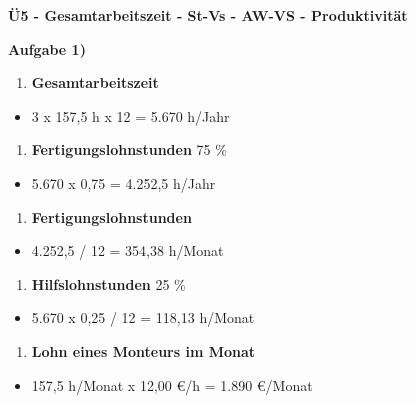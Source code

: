 \textbf{Ü5 - Gesamtarbeitszeit - St-Vs - AW-VS - Produktivität}

\textbf{Aufgabe 1)}

\begin{enumerate}
\def\labelenumi{\alph{enumi})}
\item
  \textbf{Gesamtarbeitszeit}
\end{enumerate}

\begin{itemize}
\item
  3 x 157,5 h x 12 = 5.670 h/Jahr
\end{itemize}

\begin{enumerate}
\def\labelenumi{\alph{enumi})}
\setcounter{enumi}{1}
\item
  \textbf{Fertigungslohnstunden} 75 \%
\end{enumerate}

\begin{itemize}
\item
  5.670 x 0,75 = 4.252,5 h/Jahr
\end{itemize}

\begin{enumerate}
\def\labelenumi{\alph{enumi})}
\setcounter{enumi}{2}
\item
  \textbf{Fertigungslohnstunden}
\end{enumerate}

\begin{itemize}
\item
  4.252,5 / 12 = 354,38 h/Monat
\end{itemize}

\begin{enumerate}
\def\labelenumi{\alph{enumi})}
\setcounter{enumi}{3}
\item
  \textbf{Hilfslohnstunden} 25 \%
\end{enumerate}

\begin{itemize}
\item
  5.670 x 0,25 / 12 = 118,13 h/Monat
\end{itemize}

\begin{enumerate}
\def\labelenumi{\alph{enumi})}
\setcounter{enumi}{4}
\item
  \textbf{Lohn eines Monteurs im Monat}
\end{enumerate}

\begin{itemize}
\item
  157,5 h/Monat x 12,00 €/h = 1.890 €/Monat
\end{itemize}

